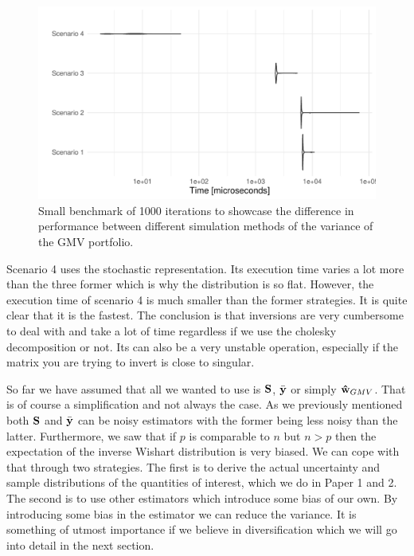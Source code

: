 \documentclass[]{book}\usepackage{knitr}
\begin{document}
\begin{knitrout}
\color{fgcolor}\begin{figure}

{\centering \includegraphics[width=\maxwidth]{figure/microbenchmark_output-1} 

}

\caption[Small benchmark of 1000 iterations to showcase the difference in performance between different simulation methods of the variance of the GMV portfolio]{Small benchmark of 1000 iterations to showcase the difference in performance between different simulation methods of the variance of the GMV portfolio.}\label{fig:microbenchmark_output}
\end{figure}

\end{knitrout}

Scenario 4 uses the stochastic representation. 
Its execution time varies a lot more than the three former which is why the distribution is so flat.
However, the execution time of scenario 4 is much smaller than the former strategies.
It is quite clear that it is the fastest. 
The conclusion is that inversions are very cumbersome to deal with and take a lot of time regardless if we use the cholesky decomposition or not.
Its can also be a very unstable operation, especially if the matrix you are trying to invert is close to singular.

So far we have assumed that all we wanted to use is $\mathbf{S}$, $\bar{\mathbf{y}}$ or simply $\mathbf{\hat{w}}_{GMV}$.
That is of course a simplification and not always the case.
As we previously mentioned both $\mathbf{S}$ and $\bar{\mathbf{y}}$ can be noisy estimators with the former being less noisy than the latter. 
Furthermore, we saw that if $p$ is comparable to $n$ but $n>p$ then the expectation of the inverse Wishart distribution is very biased.
We can cope with that through two strategies. 
The first is to derive the actual uncertainty and sample distributions of the quantities of interest, which we do in Paper 1 and 2.
The second is to use other estimators which introduce some bias of our own.
By introducing some bias in the estimator we can reduce the variance.
It is something of utmost importance if we believe in diversification which we will go into detail in the next section.
\end{document}
